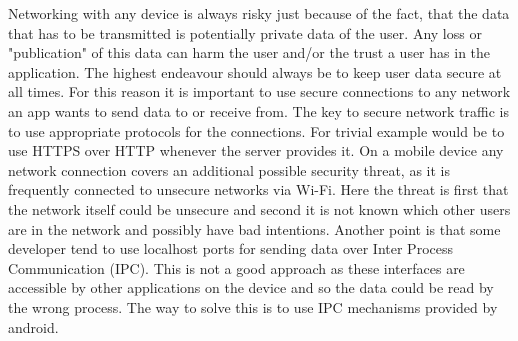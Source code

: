 Networking with any device is always risky just because of the fact, that the data that has to be transmitted is potentially private data of the user. Any loss or "publication" of this data can harm the user and/or the trust a user has in the application. The highest endeavour should always be to keep user data secure at all times. For this reason it is important to use secure connections to any network an app wants to send data to or receive from. 
The key to secure network traffic is to use appropriate protocols for the connections. For trivial example would be to use HTTPS over HTTP whenever the server provides it.
On a mobile device any network connection covers an additional possible security threat, as it is frequently connected to unsecure networks via Wi-Fi. Here the threat is first that the network itself could be unsecure and second it is not known which other users are in the network and possibly have bad intentions.
Another point is that some developer tend to use localhost ports for sending data over Inter Process Communication (IPC). This is not a good approach as these interfaces are accessible by other applications on the device and so the data could be read by the wrong process. The way to solve this is to use IPC mechanisms provided by android.